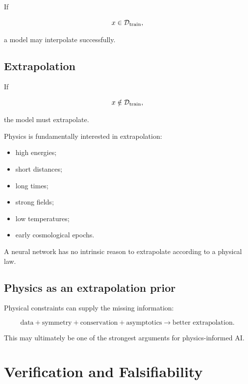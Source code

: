 \documentclass[11pt,a4paper,oneside]{book}
\begin{document}
If

\begin{equation}
x\in\mathcal{D}_{\rm train},
\end{equation}

a model may interpolate successfully.

\section{Extrapolation}

If

\begin{equation}
x\notin\mathcal{D}_{\rm train},
\end{equation}

the model must extrapolate.

Physics is fundamentally interested in extrapolation:

\begin{itemize}
\item high energies;
\item short distances;
\item long times;
\item strong fields;
\item low temperatures;
\item early cosmological epochs.
\end{itemize}

A neural network has no intrinsic reason to extrapolate according to a physical
law.

\section{Physics as an extrapolation prior}

Physical constraints can supply the missing information:

\begin{equation}
\text{data}
+
\text{symmetry}
+
\text{conservation}
+
\text{asymptotics}
\longrightarrow
\text{better extrapolation}.
\end{equation}

This may ultimately be one of the strongest arguments for physics-informed AI.

\chapter{Verification and Falsifiability}
\end{document}
